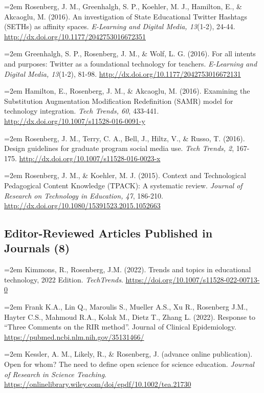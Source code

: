 \documentclass[
  14,
]{article}
\begin{document}
\hangindent=2em Rosenberg, J. M., Greenhalgh, S. P., Koehler, M. J.,
Hamilton, E., \& Akcaoglu, M. (2016). An investigation of State
Educational Twitter Hashtags (SETHs) as affinity spaces.
\emph{E-Learning and Digital Media, 13}(1-2), 24-44.
\url{http://dx.doi.org/10.1177/2042753016672351}

\hangindent=2em Greenhalgh, S. P., Rosenberg, J. M., \& Wolf, L. G.
(2016). For all intents and purposes: Twitter as a foundational
technology for teachers. \emph{E-Learning and Digital Media, 13}(1-2),
81-98. \url{http://dx.doi.org/10.1177/2042753016672131}

\hangindent=2em Hamilton, E., Rosenberg, J. M., \& Akcaoglu, M. (2016).
Examining the Substitution Augmentation Modification Redefinition (SAMR)
model for technology integration. \emph{Tech Trends, 60}, 433-441.
\url{http://dx.doi.org/10.1007/s11528-016-0091-y}

\hangindent=2em Rosenberg, J. M., Terry, C. A., Bell, J., Hiltz, V., \&
Russo, T. (2016). Design guidelines for graduate program social media
use. \emph{Tech Trends, 2}, 167-175.
\url{http://dx.doi.org/10.1007/s11528-016-0023-x}

\hangindent=2em Rosenberg, J. M., \& Koehler, M. J. (2015). Context and
Technological Pedagogical Content Knowledge (TPACK): A systematic
review. \emph{Journal of Research on Technology in Education, 47},
186-210. \url{http://dx.doi.org/10.1080/15391523.2015.1052663}

\hypertarget{editor-reviewed-articles-published-in-journals-8}{%
\subsection{Editor-Reviewed Articles Published in Journals
(8)}\label{editor-reviewed-articles-published-in-journals-8}}

\hangindent=2em Kimmons, R., Rosenberg, J.M. (2022). Trends and topics
in educational technology, 2022 Edition. \emph{TechTrends}.
\url{https://doi.org/10.1007/s11528-022-00713-0}

\hangindent=2em Frank K.A., Lin Q., Maroulis S., Mueller A.S., Xu R.,
Rosenberg J.M., Hayter C.S., Mahmoud R.A., Kolak M., Dietz T., Zhang L.
(2022). Response to ``Three Comments on the RIR method''. Journal of
Clinical Epidemiology. \url{https://pubmed.ncbi.nlm.nih.gov/35131466/}

\hangindent=2em Kessler, A. M., Likely, R., \& Rosenberg, J. (advance
online publication). Open for whom? The need to define open science for
science education. \emph{Journal of Research in Science Teaching}.
\url{https://onlinelibrary.wiley.com/doi/epdf/10.1002/tea.21730}
\end{document}
